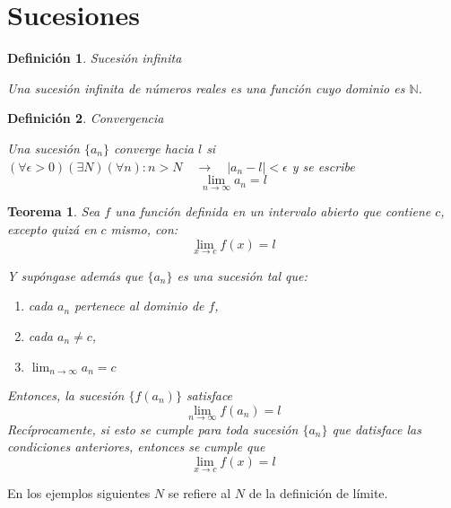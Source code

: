 \documentclass[12pt,a4paper]{extarticle}
\newtheorem{theorem}{Teorema}[section]
\newtheorem{mydef}{Definici\'on}[section]
\begin{document}
\section{Sucesiones}

\begin{mydef}{Sucesi\'on infinita}

Una sucesi\'on infinita de n\'umeros reales es una funci\'on cuyo
dominio es \(\mathbb{N}\).
\end{mydef}
\begin{mydef}{Convergencia}

Una sucesi\'on \( \{ a_n \} \) \emph{converge hacia \( l \)} si  \(
(\forall \epsilon > 0) (\exists N) (\forall n)  :   n > N
\quad \to \quad | a_n - l | < \epsilon \) y se escribe
\[ \lim_{n \to \infty} a_n = l \]
\end{mydef}
\begin{theorem}
Sea \( f \) una funci\'on definida en un intervalo abierto que contiene
\( c \), excepto quiz\'a en \( c \) mismo, con:
\[ \lim_{x \to c} f(x) = l \]

Y sup\'ongase adem\'as que \( \{ a_n \} \) es una sucesi\'on tal que:
\begin{enumerate}
\item cada \( a_n \) pertenece al dominio de \( f \),
\item cada \( a_n \neq c \),
\item \(\lim_{n \to \infty} a_n = c\)
\end{enumerate}

Entonces, la sucesi\'on \( \{ f(a_n) \} \) satisface
\[ \lim_{n \to \infty} f(a_n) = l\]
Rec\'iprocamente, si esto se cumple para toda sucesi\'on \( \{ a_n \}
\) que datisface las condiciones anteriores, entonces se cumple que
\[ \lim_{x \to c} f(x) = l \]
\end{theorem}


En los ejemplos siguientes \( N \) se refiere al \( N \) de la definici\'on
de l\'imite.
\end{document}
